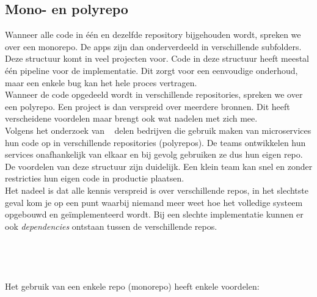 \newpage
\subsection{Mono- en polyrepo}
Wanneer alle code in één en dezelfde repository bijgehouden wordt, spreken we over een monorepo. De apps zijn dan onderverdeeld in verschillende subfolders. Deze structuur komt in veel projecten voor. Code in deze structuur heeft meestal één pipeline voor de implementatie. Dit zorgt voor een eenvoudige onderhoud, maar een enkele bug kan het hele proces vertragen.\\ 
Wanneer de code opgedeeld wordt in verschillende repositories, spreken we over een polyrepo. Een project is dan verspreid over meerdere bronnen. Dit heeft verscheidene voordelen maar brengt ook wat nadelen met zich mee.\\
Volgens het onderzoek van ~\autocite{Powell2021} delen bedrijven die gebruik maken van microservices hun code op in verschillende repositories (polyrepos). De teams ontwikkelen hun services onafhankelijk van elkaar en bij gevolg gebruiken ze dus hun eigen repo. De voordelen van deze structuur zijn duidelijk. Een klein team kan snel en zonder restricties hun eigen code in productie plaatsen.\\  
Het nadeel is dat alle kennis verspreid is over verschillende repos, in het slechtste geval kom je op een punt waarbij niemand meer weet hoe het volledige systeem opgebouwd en geïmplementeerd wordt. Bij een slechte implementatie kunnen er ook \emph{dependencies} ontstaan tussen de verschillende repos. \\
\\
\\
\\
\\
Het gebruik van een enkele repo (monorepo) heeft enkele voordelen:
